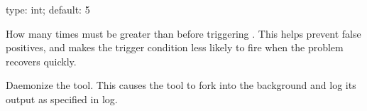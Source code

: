 \documentclass[letterpaper,10pt,english]{sphinxmanual}
\begin{document}

\begin{fulllineitems}
\label{\detokenize{mariadb-stat:cmdoption-mariadb-stat-cycles}}
\sphinxAtStartPar
type: int; default: 5

\sphinxAtStartPar
How many times {\hyperref[\detokenize{mariadb-stat:cmdoption-mariadb-stat-variable}]{}} must be greater than {\hyperref[\detokenize{mariadb-stat:cmdoption-mariadb-stat-threshold}]{}} before triggering {\hyperref[\detokenize{mariadb-stat:cmdoption-mariadb-stat-collect}]{}}.  This helps prevent false positives, and makes
the trigger condition less likely to fire when the problem recovers quickly.

\end{fulllineitems}


\begin{fulllineitems}
\label{\detokenize{mariadb-stat:cmdoption-mariadb-stat-daemonize}}
\sphinxAtStartPar
Daemonize the tool.  This causes the tool to fork into the background and log
its output as specified in \textendash{}log.

\end{fulllineitems}

\end{document}
